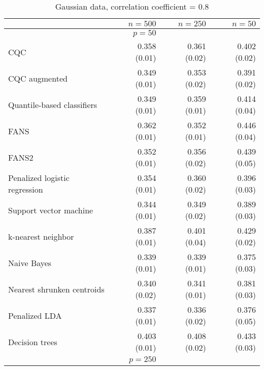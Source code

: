 \begin{table}[p]
  \centering
  \caption{Gaussian data, correlation coefficient = 0.8}
  \label{tab:gauss-corr08}
  \vspace{5mm}
  
  \begin{adjustbox}{max size={\textwidth}{10cm}}
    \begin{tabular}{l@{\extracolsep{15mm}}rrr}
      
      \hline
      & $n=500$ & $n=250$ & $n=50$ \\ 
      \hline
      & $p = 50$ \\
      \hline

      CQC & 0.358 (0.01) & 0.361 (0.02) & 0.402 (0.02) \\ 
      CQC augmented & 0.349 (0.01) & 0.353 (0.02) & 0.391 (0.02) \\ 
      Quantile-based classifiers & 0.349 (0.01) & 0.359 (0.01) & 0.414 (0.04) \\ 
      FANS  & 0.362 (0.01) & 0.352 (0.01) & 0.446 (0.04) \\
      FANS2 & 0.352 (0.01) & 0.356 (0.02) & 0.439 (0.05) \\
      Penalized logistic regression & 0.354 (0.01) & 0.360 (0.02) & 0.396 (0.03) \\ 
      Support vector machine & 0.344 (0.01) & 0.349 (0.02) & 0.389 (0.03) \\ 
      k-nearest neighbor & 0.387 (0.01) & 0.401 (0.04) & 0.429 (0.02) \\ 
      Naive Bayes & 0.339 (0.01) & 0.339 (0.01) & 0.375 (0.03) \\ 
      Nearest shrunken centroids & 0.340 (0.02) & 0.341 (0.01) & 0.381 (0.03) \\ 
      Penalized LDA & 0.337 (0.01) & 0.336 (0.02) & 0.376 (0.05) \\ 
      Decision trees & 0.403 (0.01) & 0.408 (0.02) & 0.433 (0.03) \\ [2ex]

      \hline
      & $p = 250$ \\
      \hline


\end{tabular}
\end{adjustbox}
\end{table}
